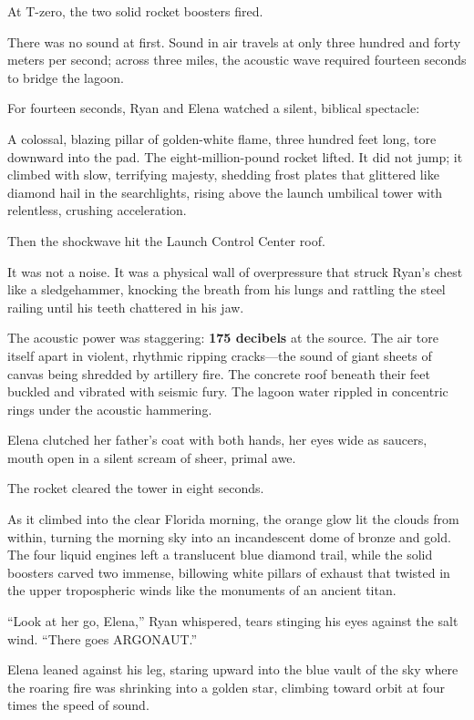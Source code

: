 \documentclass[12pt,twoside,openright]{book}
\begin{document}
At T-zero, the two solid rocket boosters fired.

There was no sound at first. Sound in air travels at only three hundred
and forty meters per second; across three miles, the acoustic wave
required fourteen seconds to bridge the lagoon.

For fourteen seconds, Ryan and Elena watched a silent, biblical
spectacle:

A colossal, blazing pillar of golden-white flame, three hundred feet
long, tore downward into the pad. The eight-million-pound rocket lifted.
It did not jump; it climbed with slow, terrifying majesty, shedding
frost plates that glittered like diamond hail in the searchlights,
rising above the launch umbilical tower with relentless, crushing
acceleration.

Then the shockwave hit the Launch Control Center roof.

It was not a noise. It was a physical wall of overpressure that struck
Ryan's chest like a sledgehammer, knocking the breath from his lungs and
rattling the steel railing until his teeth chattered in his jaw.

The acoustic power was staggering: \textbf{175 decibels} at the source.
The air tore itself apart in violent, rhythmic ripping cracks---the
sound of giant sheets of canvas being shredded by artillery fire. The
concrete roof beneath their feet buckled and vibrated with seismic fury.
The lagoon water rippled in concentric rings under the acoustic
hammering.

Elena clutched her father's coat with both hands, her eyes wide as
saucers, mouth open in a silent scream of sheer, primal awe.

The rocket cleared the tower in eight seconds.

As it climbed into the clear Florida morning, the orange glow lit the
clouds from within, turning the morning sky into an incandescent dome of
bronze and gold. The four liquid engines left a translucent blue diamond
trail, while the solid boosters carved two immense, billowing white
pillars of exhaust that twisted in the upper tropospheric winds like the
monuments of an ancient titan.

``Look at her go, Elena,'' Ryan whispered, tears stinging his eyes
against the salt wind. ``There goes ARGONAUT.''

Elena leaned against his leg, staring upward into the blue vault of the
sky where the roaring fire was shrinking into a golden star, climbing
toward orbit at four times the speed of sound.
\end{document}
